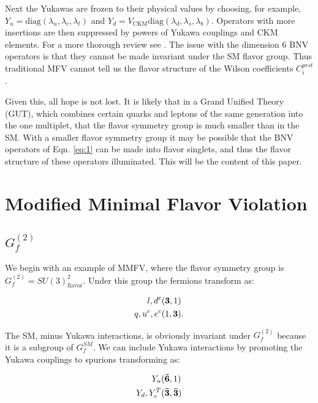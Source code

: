 \documentclass[aps,twocolumn,twoside,secnumarabic,balancelastpage,amsmath,amssymb,nofootinbib,hyperref=pdftex]{revtex4}
\begin{document}
Next the Yukawas are frozen to their physical values by choosing, for example, $Y_{u}=\text{diag}(\lambda_{u},\lambda_{c}, \lambda_{t})$ and $Y_{d}=V_{\text{CKM}}\text{diag}(\lambda_{d},\lambda_{s}, \lambda_{b})$. Operators with more insertions are then suppressed by powers of Yukawa couplings and CKM elements. For a more thorough review see \cite{MFV}. The issue with the dimension 6 BNV operators is that they cannot be made invariant under the SM flavor group\cite{dim6nogo}. Thus traditional MFV cannot tell us the flavor structure of the Wilson coefficients $C^{prst}_{i}$. 

Given this, all hope is not lost. It is likely that in a Grand Unified Theory (GUT), which combines certain quarks and leptons of the same generation into the one multiplet, that the flavor symmetry group is much smaller than in the SM. With a smaller flavor symmetry group it may be possible that the BNV operators of Eqn. \ref{eq:1} can be made into flavor singlets, and thus the flavor structure of these operators illuminated. This will be the content of this paper. 

\section{Modified Minimal Flavor Violation}

\subsection{$G^{(2)}_{f}$}

We begin with an example of MMFV, where the flavor symmetry group is $G^{(2)}_{f} = SU(3)^{2}_{\text{flavor}}$. Under this group the fermions transform as:

\begin{equation}
 \begin{aligned}
 l, d^{c}&(\bold{3},1) \\
 q,u^{c}, e^{c}&(1,\bold{3}).
 \end{aligned}
\end{equation}

The SM, minus Yukawa interactions, is obviously invariant under $G^{(2)}_{f}$ because it is a subgroup of $G^{SM}_{f}$. We can include Yukawa interactions by promoting the Yukawa couplings to spurions transforming as:

\begin{equation}
 \begin{aligned}
Y_{u}&(\bold{\bar{6}},1)\\
Y_{d},Y^{T}_{e}&(\bold{\bar{3}},\bold{\bar{3}})
 \end{aligned}
\end{equation}
\end{document}
